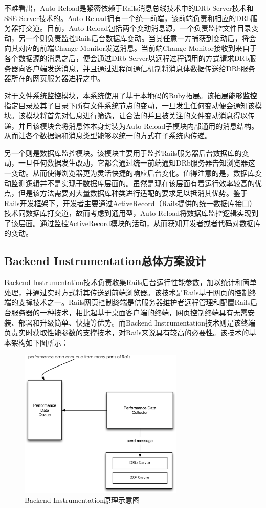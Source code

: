 不难看出，Auto Reload是紧密依赖于Rails消息总线技术中的DRb Server技术和SSE Server技术的。Auto Reload拥有一个统一前端，该前端负责和相应的DRb服务器打交道。目前，Auto Reload包括两个变动消息源，一个负责监控文件目录变动，另一个则负责监控Rails后台数据库变动。当其任意一方捕获到变动后，将会向其对应的前端Change Monitor发送消息。当前端Change Monitor接收到来自于各个数据源的消息之后，便会通过DRb Server以远程过程调用的方式请求DRb服务器向客户端发送消息，并且通过进程间通信机制将消息体数据传送给DRb服务器所在的网页服务器进程之中。

对于文件系统监控模块，本系统使用了基于本地码的Ruby拓展。该拓展能够监控指定目录及其子目录下所有文件系统节点的变动，一旦发生任何变动便会通知该模块。该模块将首先对信息进行筛选，让合法的并且被关注的文件变动消息得以传递，并且该模块会将消息体本身封装为Auto Reload子模块内部通用的消息结构。从而让各个数据源和消息类型能够以统一的方式在子系统内传递。

另一个则是数据库监控模块。该模块主要用于监控Rails服务器后台数据库的变动，一旦任何数据发生改动，它都会通过统一前端通知DRb服务器告知浏览器这一变动。从而使得浏览器更为灵活快捷的响应后台变化。值得注意的是，数据库变动监测逻辑并不是实现于数据库层面的。虽然是现在该层面有着运行效率较高的优点，但是该方法需要对大量数据库种类进行适配的要求足以抵消其优势。鉴于Rails开发框架下，开发者主要通过ActiveRecord（Rails提供的统一数据库接口）技术同数据库打交道，故而考虑到通用型，Auto Reload将数据库监控逻辑实现到了该层面。通过监控ActiveRecord模块的活动，从而获知开发者或者代码对数据库的变动。

\subsection{Backend Instrumentation总体方案设计}
Backend Instrumentation技术负责收集Rails后台运行性能参数，加以统计和简单处理，并通过实时方式将其传送到前端浏览器。该技术是Rails基于网页的控制终端的支撑技术之一。Rails网页控制终端是供服务器维护者远程管理和配置Rails后台服务器的一种技术，相比起基于桌面客户端的终端，网页控制终端具有无需安装、部署和升级简单、快捷等优势。而Backend Instrumentation技术则是该终端负责实时获取性能参数的支撑技术，对Rails来说具有较高的必要性。该技术的基本架构如下图所示：

\begin{figure}[h]
\centering
\includegraphics[width=0.7\textwidth]{images/overview/backend_instrumentation.eps}
\caption{Backend Instrumentation原理示意图}
\label{fig-reload}
\end{figure}

